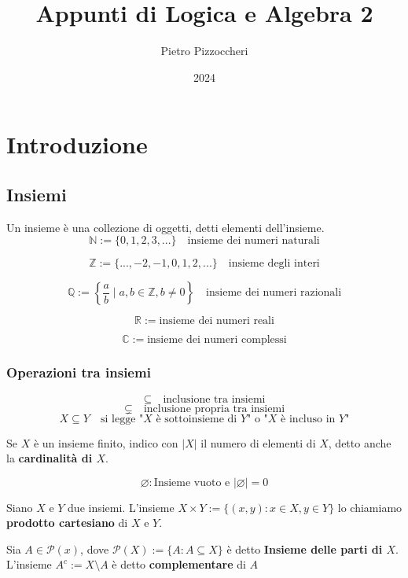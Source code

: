 \documentclass[a4paper,12pt]{article}
\title{Appunti di Logica e Algebra 2}
\author{Pietro Pizzoccheri}
\date{2024}
\theoremstyle{mystyle}
\begin{document}
\maketitle

\tableofcontents

\newpage
\section{Introduzione}
\subsection{Insiemi}

Un insieme è una collezione di oggetti, detti elementi dell'insieme.
\[
    \mathbb{N} := \{ 0,1,2,3,...\} \quad \text{insieme dei numeri naturali}
\]

\[
    \mathbb{Z} := \{ ...,-2,-1,0,1,2,...\} \quad \text{insieme degli interi}
\]

\[
    \mathbb{Q} := \left\{ \frac{a}{b} \mid a,b \in \mathbb{Z}, b \neq 0
    \right\} \quad \text{insieme dei numeri razionali}
\]

\[
    \mathbb{R} := \text{insieme dei numeri reali}
\]

\[
    \mathbb{C} := \text{insieme dei numeri complessi}
\]

\subsubsection{Operazioni tra insiemi}

\[
    \subseteq \quad \text{inclusione tra insiemi}
\]
\[
    \subsetneq \quad \text{inclusione propria tra insiemi}
\]
\[
    X \subseteq Y \quad \text{si legge "} X \text{ è sottoinsieme di }Y \text{"
        o "} X \text{ è incluso in } Y\text{"}
\]

Se \(X\) è un insieme finito, indico con \(|X|\) il numero di elementi di
\(X\), detto anche la \textbf{cardinalità di \(X\)}.

\[\varnothing : \text{Insieme vuoto e } |\varnothing| = 0\]

Siano \(X\) e \(Y\) due insiemi. L'insieme \begin{math}
    X \times Y := \{ (x,y) : x \in X , y \in Y \}
\end{math} lo chiamiamo \textbf{prodotto cartesiano} di \(X\) e \(Y\).
\vspace{\baselineskip}

Sia \begin{math}
    A \in \mathcal{P} (x)
\end{math}, dove \begin{math}
    \mathcal{P} (X) := \{ A : A \subseteq X \}
\end{math} è detto \textbf{Insieme delle parti di \(X\)}. L'insieme \begin{math}
    A^c := X \setminus A
\end{math} è detto \textbf{complementare} di \(A\)
\end{document}

